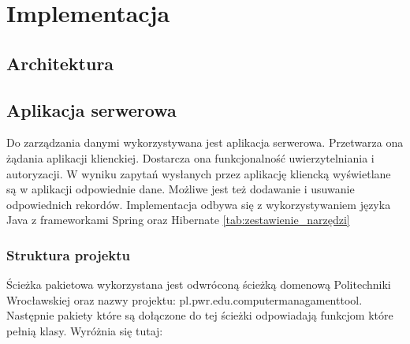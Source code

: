 \chapter{Implementacja}

\section{Architektura}






\section{Aplikacja serwerowa}
Do zarządzania danymi wykorzystywana jest aplikacja serwerowa. Przetwarza ona żądania aplikacji klienckiej. Dostarcza ona funkcjonalność uwierzytelniania i autoryzacji. W wyniku zapytań wysłanych przez aplikację kliencką wyświetlane są w aplikacji odpowiednie dane. Możliwe jest też dodawanie i usuwanie odpowiednich rekordów. Implementacja odbywa się z wykorzystywaniem języka Java z frameworkami Spring oraz Hibernate \ref{tab:zestawienie_narzędzi}

\subsection{Struktura projektu}
Ścieżka pakietowa wykorzystana jest odwróconą ścieżką domenową Politechniki Wrocławskiej oraz nazwy projektu: pl.pwr.edu.computermanagamenttool. Następnie pakiety które są dołączone do tej ścieżki odpowiadają funkcjom które pełnią klasy. Wyróżnia się tutaj:



